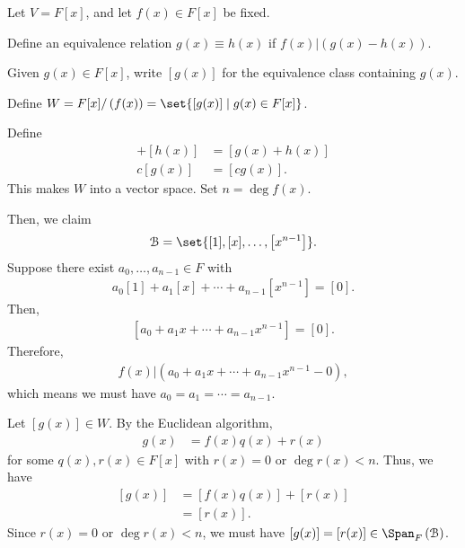 \documentclass[10pt]{mypackage}
\begin{document}
\begin{example}
  Let $V = F[x]$, and let $f(x) \in F[x]$ be fixed.\newline

  Define an equivalence relation $g(x) \equiv h(x) $ if $f(x)|\left(g(x) - h(x)\right)$.\newline

  Given $g(x) \in F[x]$, write $\left[g(x)\right]$ for the equivalence class containing $g(x)$.\newline

  Define $W = F[x] / \left(f(x)\right) = \set{\left[g(x)\right]\mid g(x)\in F[x]}$.\newline

  Define
  \begin{align*}
    [g(x)] + [h(x)] &= [g(x) + h(x)]\\
    c[g(x)] &= [cg(x)].
  \end{align*}
  This makes $W$ into a vector space. Set $n = \deg f(x)$.\newline

  Then, we claim
  \begin{align*}
    \mathcal{B} = \set{[1],[x],\dots,\left[x^{n-1}\right]}.
  \end{align*}
  Suppose there exist $a_0,\dots,a_{n-1} \in F$ with
  \begin{align*}
    a_0 [1] + a_1[x] + \cdots + a_{n-1}\left[x^{n-1}\right] = [0].
  \end{align*}
  Then,
  \begin{align*}
    \left[a_0 + a_1x + \cdots + a_{n-1}x^{n-1}\right] = [0].
  \end{align*}
  Therefore,
  \begin{align*}
    f(x) | \left(a_0 + a_1x + \cdots + a_{n-1}x^{n-1} - 0\right),
  \end{align*}
  which means we must have $a_0 = a_1 = \cdots = a_{n-1}$.\newline

  Let $\left[g(x)\right]\in W$. By the Euclidean algorithm,
  \begin{align*}
    g(x) &= f(x)q(x) + r(x)
  \end{align*}
  for some $q(x),r(x) \in F[x]$ with $r(x) = 0$ or $\deg r(x) < n$. Thus, we have
  \begin{align*}
    \left[g(x)\right] &= \left[f(x)q(x)\right] + \left[r(x)\right]\\
                      &= \left[r(x)\right].
  \end{align*}
  Since $r(x) = 0$ or $\deg r(x) < n$, we must have $\left[g(x)\right] = \left[r(x)\right]\in \Span_{F}\left(\mathcal{B}\right)$.
\end{example}
\end{document}
